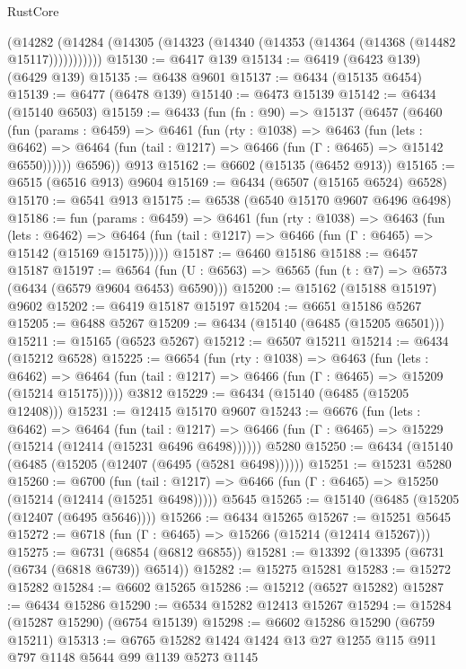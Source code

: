 \begin{lexlean}{RustCore}
\begin{coremodule}
        (@14282 (@14284 (@14305 (@14323 (@14340 (@14353 (@14364 (@14368 (@14482 @15117)))))))))))
@15130 := @6417 @139
@15134 := @6419 (@6423 @139) (@6429 @139)
@15135 := @6438 @9601
@15137 := @6434 (@15135 @6454)
@15139 := @6477 (@6478 @139)
@15140 := @6473 @15139
@15142 := @6434 (@15140 @6503)
@15159 := @6433
    (fun (fn : @90) =>
    @15137
      (@6457
        (@6460
          (fun (params : @6459) =>
          @6461
            (fun (rty : @1038) =>
            @6463
              (fun (lets : @6462) =>
              @6464 (fun (tail : @1217) => @6466 (fun (Γ : @6465) => @15142 @6550))))))
        @6596))
    @913
@15162 := @6602 (@15135 (@6452 @913))
@15165 := @6515 (@6516 @913) @9604
@15169 := @6434 (@6507 (@15165 @6524) @6528)
@15170 := @6541 @913
@15175 := @6538 (@6540 @15170 @9607 @6496 @6498)
@15186 := fun (params : @6459) =>
  @6461
    (fun (rty : @1038) =>
    @6463
      (fun (lets : @6462) =>
      @6464 (fun (tail : @1217) => @6466 (fun (Γ : @6465) => @15142 (@15169 @15175)))))
@15187 := @6460 @15186
@15188 := @6457 @15187
@15197 := @6564 (fun (U : @6563) => @6565 (fun (t : @7) => @6573 (@6434 (@6579 @9604 @6453) @6590)))
@15200 := @15162 (@15188 @15197) @9602
@15202 := @6419 @15187 @15197
@15204 := @6651 @15186 @5267
@15205 := @6488 @5267
@15209 := @6434 (@15140 (@6485 (@15205 @6501)))
@15211 := @15165 (@6523 @5267)
@15212 := @6507 @15211
@15214 := @6434 (@15212 @6528)
@15225 := @6654
    (fun (rty : @1038) =>
    @6463
      (fun (lets : @6462) =>
      @6464 (fun (tail : @1217) => @6466 (fun (Γ : @6465) => @15209 (@15214 @15175)))))
    @3812
@15229 := @6434 (@15140 (@6485 (@15205 @12408)))
@15231 := @12415 @15170 @9607
@15243 := @6676
    (fun (lets : @6462) =>
    @6464
      (fun (tail : @1217) =>
      @6466 (fun (Γ : @6465) => @15229 (@15214 (@12414 (@15231 @6496 @6498))))))
    @5280
@15250 := @6434 (@15140 (@6485 (@15205 (@12407 (@6495 (@5281 @6498))))))
@15251 := @15231 @5280
@15260 := @6700
    (fun (tail : @1217) => @6466 (fun (Γ : @6465) => @15250 (@15214 (@12414 (@15251 @6498)))))
    @5645
@15265 := @15140 (@6485 (@15205 (@12407 (@6495 @5646))))
@15266 := @6434 @15265
@15267 := @15251 @5645
@15272 := @6718 (fun (Γ : @6465) => @15266 (@15214 (@12414 @15267)))
@15275 := @6731 (@6854 (@6812 @6855))
@15281 := @13392 (@13395 (@6731 (@6734 (@6818 @6739)) @6514))
@15282 := @15275 @15281
@15283 := @15272 @15282
@15284 := @6602 @15265
@15286 := @15212 (@6527 @15282)
@15287 := @6434 @15286
@15290 := @6534 @15282 @12413 @15267
@15294 := @15284 (@15287 @15290) (@6754 @15139)
@15298 := @6602 @15286 @15290 (@6759 @15211)
@15313 := @6765 @15282 @1424 @1424 @13 @27 @1255 @115 @911 @797 @1148 @5644 @99 @1139 @5273 @1145

\end{coremodule}
\end{lexlean}
